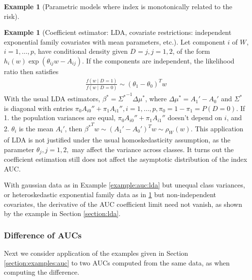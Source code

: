 \documentclass[12pt]{article}
\renewcommand{\P}{P}
\newcommand{\W}[1][]{W_{#1}}
\newcommand{\D}[1][]{D_{#1}}
\renewcommand{\t}[1]{{#1}^T}
\renewcommand{\star}[1]{{#1}^\ast}
\newcommand{\risk}[1][]{\rho_{#1}}
\theoremstyle{definition}
\newtheorem{example}{Example}%
\newtheorem{subexample}{Example}%
\begin{document}
\begin{example}[Parametric models where index is monotonically related
  to the risk]
\begin{subexample}[Coefficient estimator: LDA, covariate restrictions:
  independent exponential family covariates with mean
  parameters, etc.]\label{example:auc:exponential} Let component $i$ of $\W$,
  $i=1,\ldots,p$, have conditional density given $\D=j,j=1,2$, of the
  form $h_i(w)\exp(\theta_{ij}w-A_{ij})$. If the components
  are independent, the likelihood ratio then satisfies
\begin{align}
   \frac{f(w\mid \D=1)}{f(w\mid \D=0)} \sim \t{(\theta_1-\theta_0)}w
\end{align}
With the usual LDA estimators, $\star\beta={\star{\Sigma}}^{-1}\Delta\star{\mu}$, where $\Delta\star{\mu}=A_1'-A_0'$ and $\star\Sigma$ is diagonal with entries $\pi_0A_{i0}''+\pi_1A_{i1}'',i=1,\ldots,p, \pi_0=1-\pi_1=\P(D=0)$. If 1. the population variances are equal, $\pi_0A_{i0}''+\pi_1A_{i1}''$ doesn't depend on $i$, and 2. $\theta_i$ is the mean $A_i'$, then $\t{\star{\beta}}w \sim \t{(A_1'-A_0')}w \sim \risk[\W](w)$.
This application of LDA is not justified under the usual
homoskedasticity assumption, as the parameter $\theta_j,j=1,2,$ may
affect the variance across classes. It turns out the coefficient
estimation still does not affect the asymptotic distribution of the index AUC.
\end{subexample}
\end{example}

With gaussian data as in Example \ref{example:auc:lda} but unequal
class variances, or heteroskedastic exponential family data as in
\ref{example:auc:exponential} but non-independent covariates, the
derivative of the AUC coefficient limit need not vanish, as shown by
the example in Section \ref{section:lda}.

\subsubsection{Difference of AUCs}
Next we consider application of the examples given in Section \ref{section:examples:auc} to two AUCs computed from the same data, as when
computing the difference.
\end{document}
